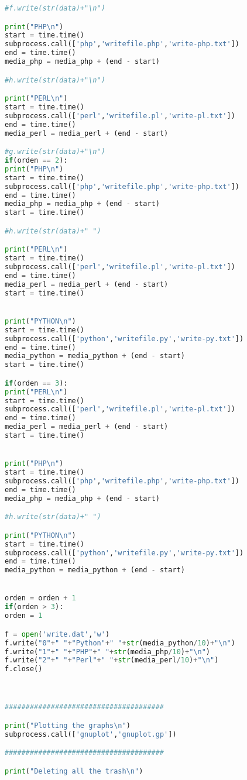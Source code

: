\begin{lstlisting}[language=python]
#f.write(str(data)+"\n")

print("PHP\n")
start = time.time()
subprocess.call(['php','writefile.php','write-php.txt'])
end = time.time()
media_php = media_php + (end - start)

#h.write(str(data)+"\n")

print("PERL\n")
start = time.time()
subprocess.call(['perl','writefile.pl','write-pl.txt'])
end = time.time()
media_perl = media_perl + (end - start)

#g.write(str(data)+"\n")
if(orden == 2):
print("PHP\n")
start = time.time()
subprocess.call(['php','writefile.php','write-php.txt'])
end = time.time()
media_php = media_php + (end - start)
start = time.time()

#h.write(str(data)+" ")

print("PERL\n")
start = time.time()
subprocess.call(['perl','writefile.pl','write-pl.txt'])
end = time.time()
media_perl = media_perl + (end - start)
start = time.time()


print("PYTHON\n")
start = time.time()
subprocess.call(['python','writefile.py','write-py.txt'])
end = time.time()
media_python = media_python + (end - start)
start = time.time()

if(orden == 3):
print("PERL\n")
start = time.time()
subprocess.call(['perl','writefile.pl','write-pl.txt'])
end = time.time()
media_perl = media_perl + (end - start)
start = time.time()


print("PHP\n")
start = time.time()
subprocess.call(['php','writefile.php','write-php.txt'])
end = time.time()
media_php = media_php + (end - start)

#h.write(str(data)+" ")

print("PYTHON\n")
start = time.time()
subprocess.call(['python','writefile.py','write-py.txt'])
end = time.time()
media_python = media_python + (end - start)


orden = orden + 1
if(orden > 3):
orden = 1

f = open('write.dat','w')
f.write("0"+" "+"Python"+" "+str(media_python/10)+"\n")
f.write("1"+" "+"PHP"+" "+str(media_php/10)+"\n")
f.write("2"+" "+"Perl"+" "+str(media_perl/10)+"\n")
f.close()



######################################

print("Plotting the graphs\n")
subprocess.call(['gnuplot','gnuplot.gp'])

######################################

print("Deleting all the trash\n")


\end{lstlisting}
